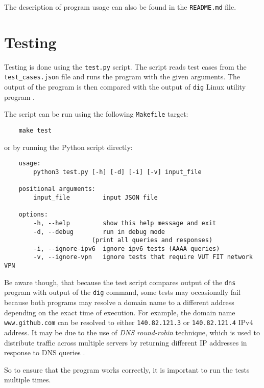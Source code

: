 \documentclass[a4paper, 11pt]{article}
\begin{document}
    The description of program usage can also be found in the \texttt{README.md} file.
\section{Testing}
    Testing is done using the \texttt{test.py} script.
    The script reads test cases from the \texttt{test\_cases.json} file and runs the program with the given arguments.
    The output of the program is then compared with the output of \texttt{dig} Linux utility program \cite{2023}.

    The script can be run using the following \texttt{Makefile} target:
    \begin{verbatim}
    make test
    \end{verbatim}
    or by running the Python script directly:
    \begin{verbatim}
    usage:
        python3 test.py [-h] [-d] [-i] [-v] input_file

    positional arguments:
        input_file         input JSON file

    options:
        -h, --help         show this help message and exit
        -d, --debug        run in debug mode 
                        (print all queries and responses)
        -i, --ignore-ipv6  ignore ipv6 tests (AAAA queries)
        -v, --ignore-vpn   ignore tests that require VUT FIT network VPN
    \end{verbatim}

    Be aware though, that because the test script compares output of the \texttt{dns} program with output of the \texttt{dig} command, 
    some tests may occasionally fail because both programs may resolve a domain name 
    to a different address depending on the exact time of execution.
    For example, the domain name \texttt{www.github.com} can be resolved to either \texttt{140.82.121.3} or \texttt{140.82.121.4} IPv4 address. 
    It may be due to the use of \emph{DNS round-robin} technique, 
    which is used to distribute traffic across multiple servers by returning different IP addresses in response to DNS queries \cite{Brisco1995}.
    
    So to ensure that the program works correctly, it is important to run the tests multiple times.


\printbibliography %
\end{document}
